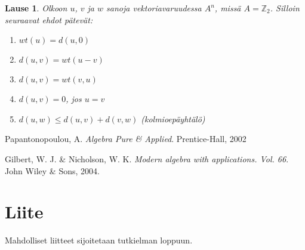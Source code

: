 \documentclass[a4paper,12pt,leqno,oneside]{report} %
\theoremstyle{plain}
\newtheorem{lause}{Lause}[chapter]
\theoremstyle{definition}
\theoremstyle{remark}
\numberwithin{equation}{chapter}
\newcommand*{\Zset}{\mathbb{Z}}  %
\begin{document}
     \begin{lause}\label{theorem: Hamming}
         Olkoon $u$, $v$ ja $w$ sanoja vektoriavaruudessa $A^n$, missä $A = \Zset_2$. Silloin seuraavat ehdot pätevät:
         \begin{enumerate}
             \item $wt\left(u\right) = d\left(u, 0\right)$
             \item $d\left(u, v\right) = wt\left(u - v\right)$
             \item $d\left(u, v\right) = wt\left(v, u\right)$
             \item $d\left(u, v\right) = 0$, jos $u = v$
             \item $d\left(u, w\right) \le d\left(u, v\right) + d\left(v, w\right)$ \quad (kolmioepäyhtälö)
         \end{enumerate}
     \end{lause}



    \begin{thebibliography}{9}


        Papantonopoulou, A.
        \emph{Algebra Pure \& Applied}.
        Prentice-Hall, 2002

        Gilbert, W. J. \& Nicholson, W. K.
        \emph{Modern algebra with applications. Vol. 66}.
        John Wiley & Sons, 2004.

\end{thebibliography}


\chapter*{Liite}

Mahdolliset liitteet sijoitetaan tutkielman loppuun.

%
\end{document}
